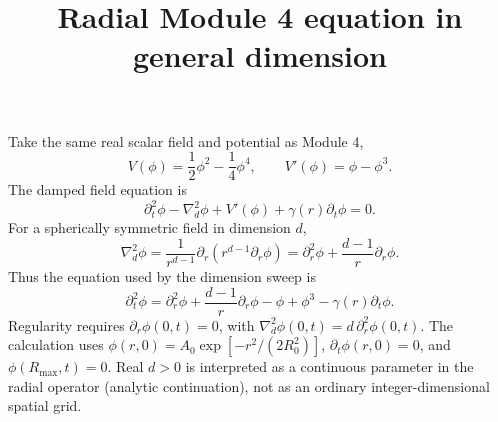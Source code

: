 \documentclass[11pt]{article}
\title{Radial Module 4 equation in general dimension}
\date{}
\begin{document}
\maketitle

Take the same real scalar field and potential as Module 4,
\[
  V(\phi)=\frac{1}{2}\phi^2-\frac{1}{4}\phi^4,
  \qquad V'(\phi)=\phi-\phi^3.
\]
The damped field equation is
\[
  \partial_t^2\phi-\nabla_d^2\phi+V'(\phi)
  +\gamma(r)\partial_t\phi=0.
\]
For a spherically symmetric field in dimension \(d\),
\[
  \nabla_d^2\phi
  =\frac{1}{r^{d-1}}\partial_r\!\left(r^{d-1}\partial_r\phi\right)
  =\partial_r^2\phi+\frac{d-1}{r}\partial_r\phi.
\]
Thus the equation used by the dimension sweep is
\[
  \boxed{\partial_t^2\phi
  =\partial_r^2\phi+\frac{d-1}{r}\partial_r\phi
  -\phi+\phi^3-\gamma(r)\partial_t\phi.}
\]
Regularity requires \(\partial_r\phi(0,t)=0\), with
\(\nabla_d^2\phi(0,t)=d\,\partial_r^2\phi(0,t)\). The calculation uses
\(\phi(r,0)=A_0\exp[-r^2/(2R_0^2)]\), \(\partial_t\phi(r,0)=0\), and
\(\phi(R_{\max},t)=0\). Real \(d>0\) is interpreted as a continuous
parameter in the radial operator (analytic continuation), not as an ordinary
integer-dimensional spatial grid.
\end{document}

